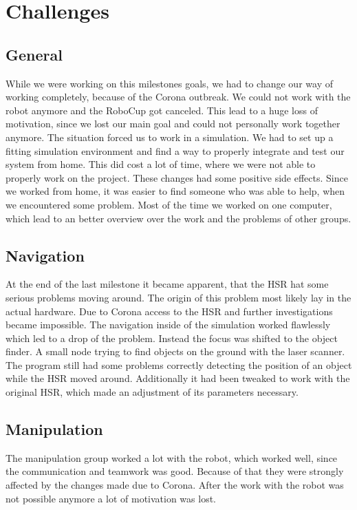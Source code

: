 \documentclass[main.tex]{subfiles}
\begin{document}
	
	\chapter{Challenges}

\section{General}

While we were working on this milestones goals, we had to change our way of working completely, because of the Corona outbreak.
We could not work with the robot anymore and the RoboCup got canceled. This lead to a huge loss of motivation, since we lost our main goal and could not personally work together anymore.
The situation forced us to work in a simulation. We had to set up a fitting simulation environment and find a way to properly integrate and test our system from home. This did cost a lot of time, where we were not able to properly work on the project.
These changes had some positive side effects. Since we worked from home, it was easier to find someone who was able to help, when we encountered some problem. Most of the time we worked on one computer, which lead to an better overview over the work and the problems of other groups.

\section{Navigation}
At the end of the last milestone it became apparent, that the HSR hat some serious problems moving around. The origin of this problem most likely lay in the actual hardware. Due to Corona access to the HSR and further investigations became impossible. The navigation inside of the simulation worked flawlessly which led to a drop of the problem. Instead the focus was shifted to the object finder. A small node trying to find objects on the ground with the laser scanner. The program still had some problems correctly detecting the position of an object while the HSR moved around. Additionally it had been tweaked to work with the original HSR, which made an adjustment of its parameters necessary.  

\section{Manipulation}

The manipulation group worked a lot with the robot, which worked well, since the communication and teamwork was good.
Because of that they were strongly affected by the changes made due to Corona. After the work with the robot was not possible anymore a lot of motivation was lost.
\end{document}
